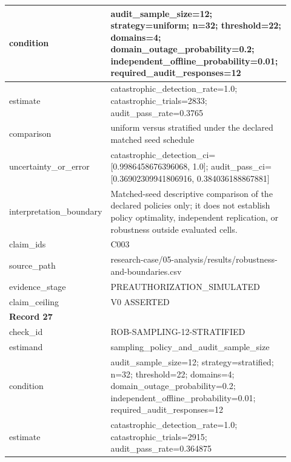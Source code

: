 \begin{longtable}{|p{0.24\linewidth}|p{0.68\linewidth}|}
condition & audit\_\allowbreak{}sample\_\allowbreak{}size=12;\allowbreak{} strategy=uniform;\allowbreak{} n=32;\allowbreak{} threshold=22;\allowbreak{} domains=4;\allowbreak{} domain\_\allowbreak{}outage\_\allowbreak{}probability=0.2;\allowbreak{} independent\_\allowbreak{}offline\_\allowbreak{}probability=0.01;\allowbreak{} required\_\allowbreak{}audit\_\allowbreak{}responses=12 \\ \hline
estimate & catastrophic\_\allowbreak{}detection\_\allowbreak{}rate=1.0;\allowbreak{} catastrophic\_\allowbreak{}trials=2833;\allowbreak{} audit\_\allowbreak{}pass\_\allowbreak{}rate=0.3765 \\ \hline
comparison & uniform versus stratified under the declared matched seed schedule \\ \hline
uncertainty\_\allowbreak{}or\_\allowbreak{}error & catastrophic\_\allowbreak{}detection\_\allowbreak{}ci=[0.9986458676396068, 1.0];\allowbreak{} audit\_\allowbreak{}pass\_\allowbreak{}ci=[0.36902309941806916, 0.384036188867881] \\ \hline
interpretation\_\allowbreak{}boundary & Matched-seed descriptive comparison of the declared policies only;\allowbreak{} it does not establish policy optimality, independent replication, or robustness outside evaluated cells. \\ \hline
claim\_\allowbreak{}ids & C003 \\ \hline
source\_\allowbreak{}path & research-case/05-analysis/results/robustness-and-boundaries.csv \\ \hline
evidence\_\allowbreak{}stage & PREAUTHORIZATION\_\allowbreak{}SIMULATED \\ \hline
claim\_\allowbreak{}ceiling & V0 ASSERTED \\ \hline
\multicolumn{2}{|l|}{\textbf{Record 27}} \\ \hline
check\_\allowbreak{}id & ROB-SAMPLING-12-STRATIFIED \\ \hline
estimand & sampling\_\allowbreak{}policy\_\allowbreak{}and\_\allowbreak{}audit\_\allowbreak{}sample\_\allowbreak{}size \\ \hline
condition & audit\_\allowbreak{}sample\_\allowbreak{}size=12;\allowbreak{} strategy=stratified;\allowbreak{} n=32;\allowbreak{} threshold=22;\allowbreak{} domains=4;\allowbreak{} domain\_\allowbreak{}outage\_\allowbreak{}probability=0.2;\allowbreak{} independent\_\allowbreak{}offline\_\allowbreak{}probability=0.01;\allowbreak{} required\_\allowbreak{}audit\_\allowbreak{}responses=12 \\ \hline
estimate & catastrophic\_\allowbreak{}detection\_\allowbreak{}rate=1.0;\allowbreak{} catastrophic\_\allowbreak{}trials=2915;\allowbreak{} audit\_\allowbreak{}pass\_\allowbreak{}rate=0.364875 \\ \hline

\end{longtable}
